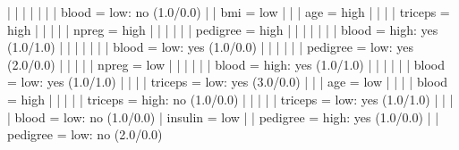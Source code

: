 |   |   |   |   |   |   |   blood = low: no (1.0/0.0)
|   |   bmi = low
|   |   |   age = high
|   |   |   |   triceps = high
|   |   |   |   |   npreg = high
|   |   |   |   |   |   pedigree = high
|   |   |   |   |   |   |   blood = high: yes (1.0/1.0)
|   |   |   |   |   |   |   blood = low: yes (1.0/0.0)
|   |   |   |   |   |   pedigree = low: yes (2.0/0.0)
|   |   |   |   |   npreg = low
|   |   |   |   |   |   blood = high: yes (1.0/1.0)
|   |   |   |   |   |   blood = low: yes (1.0/1.0)
|   |   |   |   triceps = low: yes (3.0/0.0)
|   |   |   age = low
|   |   |   |   blood = high
|   |   |   |   |   triceps = high: no (1.0/0.0)
|   |   |   |   |   triceps = low: yes (1.0/1.0)
|   |   |   |   blood = low: no (1.0/0.0)
|   insulin = low
|   |   pedigree = high: yes (1.0/0.0)
|   |   pedigree = low: no (2.0/0.0)
